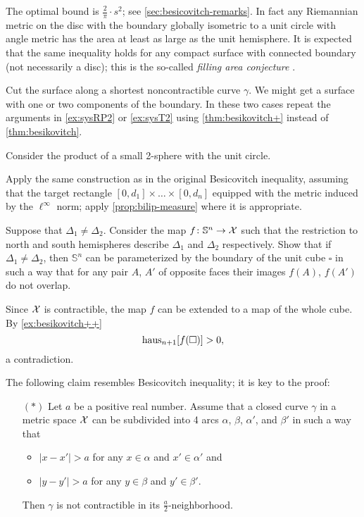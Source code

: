 The optimal bound is $\tfrac2 \pi\cdot s^2$; see  \ref{sec:besicovitch-remarks}.
In fact any Riemannian metric on the disc with the boundary globally isometric to a unit circle with angle metric has the area at least as large as the unit hemisphere.
It is expected that the same inequality holds for any compact surface with connected boundary (not necessarily a disc);
this is the so-called \emph{filling area conjecture} \cite[it is mentioned Mikhael Gromov in 5.5.$\mathrm{B}'(\mathrm{e}')$ of][]{gromov-1983}.

 Cut the surface along a shortest noncontractible curve $\gamma$. 
We might get a surface with one or two components of the boundary.
In these two cases repeat the arguments in \ref{ex:sysRP2} or \ref{ex:sysT2} using \ref{thm:besikovitch+} instead of \ref{thm:besikovitch}.


 Consider the product of a small 2-sphere with the unit circle.

Apply the same construction as in the original Besicovitch inequality, assuming that the target rectangle
$[0,d_1]\times\dots\times [0,d_n]$ equipped with the metric induced by the $\ell^\infty$ norm;
apply \ref{prop:bilip-measure} where it is appropriate.

 Suppose that $\Delta_1\ne\Delta_2$.
Consider the map $f\colon\mathbb{S}^n\to \mathcal{X}$ such that the restriction to north and south hemispheres describe $\Delta_1$ and $\Delta_2$ respectively.
Show that if $\Delta_1\ne\Delta_2$, then $\mathbb{S}^n$ can be parameterized by the boundary of the unit cube $\square$ in such a way that for any pair $A$, $A'$ of opposite faces their images $f(A)$, $f(A')$ do not overlap.

Since $\mathcal{X}$ is contractible, the map $f$ can be extended to a map of the whole cube.
By \ref{ex:besikovitch++} 
\[\mathrm{haus}_{n+1}[f(\square)]>0,\]
a contradiction.


The following claim resembles Besicovitch inequality;
it is key to the proof:
\begin{itemize}
 \item[$({*})$] Let $a$ be a positive real number.
 Assume that a closed curve $\gamma$ in a metric space $\mathcal{X}$ can be subdivided into 4 arcs $\alpha$, $\beta$, $\alpha'$, and $\beta'$ in such a way that 
 \begin{itemize}
 \item $|x-x'|>a$ for any $x\in\alpha$ and $x'\in \alpha'$
 and
 \item $|y-y'|>a$ for any $y\in\beta$ and $y'\in \beta'$.
 \end{itemize}
 Then $\gamma$ is not contractible in its $\tfrac a2$-neighborhood.
\end{itemize}

